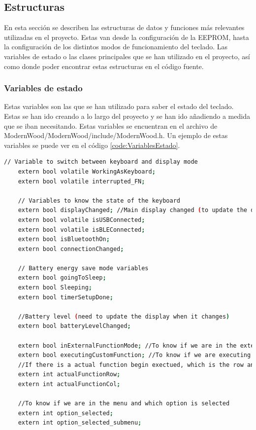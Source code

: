 \subsection{Estructuras}

En esta sección se describen las estructuras de datos y funciones más relevantes utilizadas en el proyecto. Estas van desde la configuración de la \gls{EEPROM}, hasta la configuración de los distintos modos de funcionamiento del teclado. Las variables de estado o las clases principales que se han utilizado en el proyecto, así como donde poder encontrar estas estructuras en el código fuente.
\subsubsection{Variables de estado}

Estas variables son las que se han utilizado para saber el estado del teclado. Estas se han ido creando a lo largo del proyecto y se han ido añadiendo a medida que se iban necesitando. Estas variables se encuentran en el archivo de ModernWood/ModernWood/include/ModernWood.h. Un ejemplo de estas variables se puede ver en el código \ref{code:VariablesEstado}.

\begin{lstlisting}[style=console, language=bash, caption={Variables de estado del teclado}, label={code:VariablesEstado}]
    // Variable to switch between keyboard and display mode
    extern bool volatile WorkingAsKeyboard;
    extern bool volatile interrupted_FN;

    // Variables to know the state of the keyboard
    extern bool displayChanged; //Main display changed (to update the display in the main loop)
    extern bool volatile isUSBConnected;
    extern bool volatile isBLEConnected;
    extern bool isBluetoothOn;
    extern bool connectionChanged;
    
    // Battery energy save mode variables
    extern bool goingToSleep;
    extern bool Sleeping;
    extern bool timerSetupDone;

    //Battery level (need to update the display when it changes)
    extern bool batteryLevelChanged;
    
    extern bool inExternalFunctionMode; //To know if we are in the external function mode
    extern bool executingCustomFunction; //To know if we are executing a custom function
    //If there is a actual function begin exectued, which is the row and col of the key
    extern int actualFunctionRow; 
    extern int actualFunctionCol;

    //To know if we are in the menu and which option is selected
    extern int option_selected;
    extern int option_selected_submenu;

\end{lstlisting}

